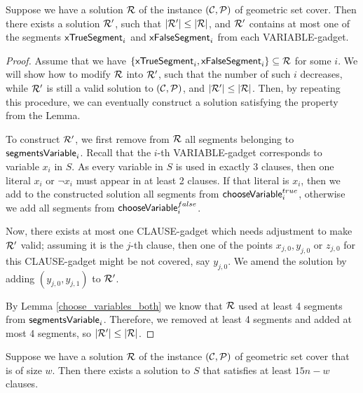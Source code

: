 \begin{lemma}
	\label{at_most_one_var_segment}
	Suppose we have a solution $\mathcal{R}$ of the instance $(\mathcal{C}, \mathcal{P})$
	of geometric set cover.
	Then there exists a solution $\mathcal{R}'$, such that $|\mathcal{R}'| \le |\mathcal{R}|$,
	and $\mathcal{R}'$ contains
	at most one of the segments $\mathsf{xTrueSegment}_{i}$ and $\mathsf{xFalseSegment}_{i}$
	from each VARIABLE-gadget.
\end{lemma}
\begin{proof}\leavevmode
Assume that we have $\{\mathsf{xTrueSegment}_{i}, \mathsf{xFalseSegment}_{i}\} \subseteq \mathcal{R}$ for some $i$.
We will show how to modify $\mathcal{R}$ into $\mathcal{R}'$,
such that the number of such $i$ decreases,
while $\mathcal{R}'$ is still a valid solution to $(\mathcal{C}, \mathcal{P})$,
and $|\mathcal{R}'| \le |\mathcal{R}|$. Then, by repeating this procedure,
we can eventually construct a solution satisfying the property from the Lemma.

To construct $\mathcal{R}'$, 
we first remove from $\mathcal{R}$ all segments belonging to $\mathsf{segmentsVariable}_{i}$.
Recall that the $i$-th VARIABLE-gadget corresponds to variable $x_i$ in $S$.
As every variable in $S$ is used in exactly 3 clauses,
then one literal $x_i$ or $\neg x_i$ must appear in at least
2 clauses.
If that literal is $x_i$, then we add to the constructed solution all segments from $\mathsf{chooseVariable}^{true}_{i}$,
otherwise we add all segments from $\mathsf{chooseVariable}^{false}_{i}$.

Now, there exists at most one CLAUSE-gadget which needs adjustment to make $\mathcal{R}'$ valid;
assuming it is the $j$-th clause, then one of the points $x_{j,0}, y_{j,0}$ or $z_{j,0}$ for this
CLAUSE-gadget might be not covered, say $y_{j,0}$.
We amend the solution by adding $(y_{j,0}, y_{j,1})$ to $\mathcal{R}'$.

By Lemma \ref{choose_variables_both} we know 
that $\mathcal{R}$ used at least 4 segments from $\mathsf{segmentsVariable}_{i}$.
Therefore, we removed at least 4 segments and added at most 4 segments,
so $|\mathcal{R}'| \le |\mathcal{R}|$.
\end{proof}

\begin{lemma}
	\label{construction_completness}
	Suppose we have a solution $\mathcal{R}$ of the instance $(\mathcal{C}, \mathcal{P})$
	of geometric set cover that is of size $w$.
	Then there exists a solution to $S$
	that satisfies at least $15n - w$ clauses.
\end{lemma}



